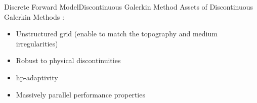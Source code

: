 \begin{frame}{Discrete Forward Model}{Discontinuous Galerkin Method}
  Assets of Discontinuous Galerkin Methods : \\

  \begin{itemize}
  \item Unstructured grid (enable to match the topography and medium irregularities)
  \item Robust to physical discontinuities
  \item hp-adaptivity
  \item Massively parallel performance properties
  \end{itemize}

  \begin{figure}[H]
    \centering
    \subfigure[h-adaptivity]{
      
}
    \hspace{1cm}
\end{figure}

\end{frame}
